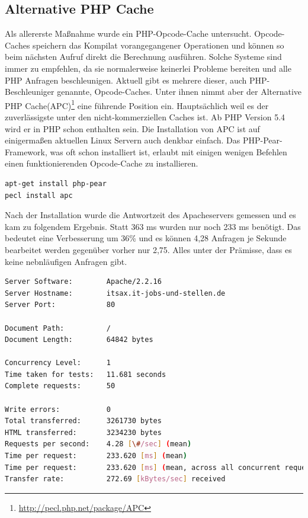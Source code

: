 \subsection{Alternative PHP Cache} Als allererste Maßnahme wurde ein PHP-Opcode-Cache untersucht. Opcode-Caches speichern das Kompilat vorangegangener Operationen und können so beim nächsten Aufruf direkt die Berechnung ausf\"uhren. Solche Systeme sind immer zu empfehlen, da sie normalerweise keinerlei Probleme bereiten und alle PHP Anfragen beschleunigen. Aktuell gibt es mehrere dieser, auch PHP-Beschleuniger genannte, Opcode-Caches. Unter ihnen nimmt aber der Alternative PHP Cache(APC)\footnote{\url{http://pecl.php.net/package/APC}} eine führende Position ein. Hauptsächlich weil es der zuverlässigste unter den nicht-kommerziellen Caches ist. Ab PHP Version 5.4 wird er in PHP schon enthalten sein.
Die Installation von APC ist auf einigermaßen aktuellen Linux Servern auch denkbar einfach. Das PHP-Pear-Framework, was oft schon installiert ist, erlaubt mit einigen wenigen Befehlen einen funktionierenden Opcode-Cache zu installieren. 
\begin{lstlisting}[language=bash,label=Installation von APC,caption=Installation von APC]
apt-get install php-pear
pecl install apc
\end{lstlisting}
Nach der Installation wurde die Antwortzeit des Apacheservers gemessen und es kam zu folgendem Ergebnis. Statt 363 ms wurden nur noch 233 ms benötigt. Das bedeutet eine Verbesserung um 36\% und es können 4,28 Anfragen je Sekunde bearbeitet werden gegenüber vorher nur 2,75. Alles unter der Prämisse, dass es keine nebnl\"aufigen Anfragen gibt. 
\begin{lstlisting}[language=bash,label=Ausgabe von ab,caption=Ausgabe von ab]
Server Software:        Apache/2.2.16
Server Hostname:        itsax.it-jobs-und-stellen.de
Server Port:            80

Document Path:          /
Document Length:        64842 bytes

Concurrency Level:      1
Time taken for tests:   11.681 seconds
Complete requests:      50

Write errors:           0
Total transferred:      3261730 bytes
HTML transferred:       3234230 bytes
Requests per second:    4.28 [\#/sec] (mean)
Time per request:       233.620 [ms] (mean)
Time per request:       233.620 [ms] (mean, across all concurrent requests)
Transfer rate:          272.69 [kBytes/sec] received
\end{lstlisting}
